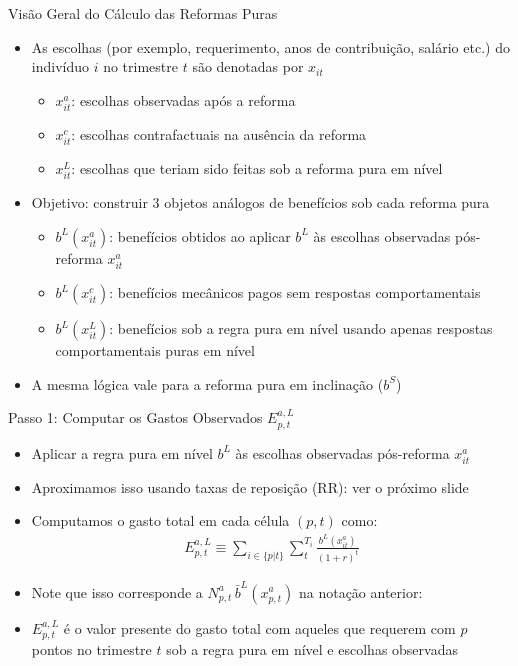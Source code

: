 \begin{frame}[label=pureDetails]{Visão Geral do Cálculo das Reformas Puras}
\begin{itemize}
    \item As escolhas (por exemplo, requerimento, anos de contribuição, salário etc.) do indivíduo $i$ no trimestre $t$ são denotadas por $x_{it}$
    \begin{itemize}
        \item $x^a_{it}$: escolhas observadas após a reforma
        \item $x^c_{it}$: escolhas contrafactuais na ausência da reforma
        \item $x^L_{it}$: escolhas que teriam sido feitas sob a reforma pura em nível
    \end{itemize}
    \item Objetivo: construir 3 objetos análogos de benefícios sob cada reforma pura
    \begin{itemize}
        \item $b^{L}(x^a_{it})$: benefícios obtidos ao aplicar $b^{L}$ às escolhas observadas pós-reforma $x^a_{it}$
        \item $b^{L}(x^c_{it})$: benefícios mecânicos pagos sem respostas comportamentais
        \item $b^{L}(x^{L}_{it})$: benefícios sob a regra pura em nível usando apenas respostas comportamentais puras em nível
    \end{itemize}
    \item A mesma lógica vale para a reforma pura em inclinação ($b^{S}$)
\end{itemize}
\end{frame}

\begin{frame}{Passo 1: Computar os Gastos Observados $E^{a,L}_{p,t}$}
\begin{itemize}
    \item Aplicar a regra pura em nível $b^{L}$ às escolhas observadas pós-reforma $x^a_{it}$
    \item Aproximamos isso usando taxas de reposição (RR): ver o próximo slide
    
    \item {Computamos o gasto total em cada célula $(p,t)$ como:}
    \begin{align*}
        {E^{a,L}_{p,t} \equiv \sum_{i \in \{p|t\}} \sum_t^{T_i} \frac{b^L(x^a_{it})}{(1+r)^t}}
    \end{align*}
    
    \item {Note que isso corresponde a $N^a_{p,t}\,\bar b^L(x^a_{p,t})$ na notação anterior:}
    
    \item {$E^{a,L}_{p,t}$ é o valor presente do gasto total com aqueles que requerem com $p$ pontos no trimestre $t$ sob a regra pura em nível e escolhas observadas}
\end{itemize}
\end{frame}

